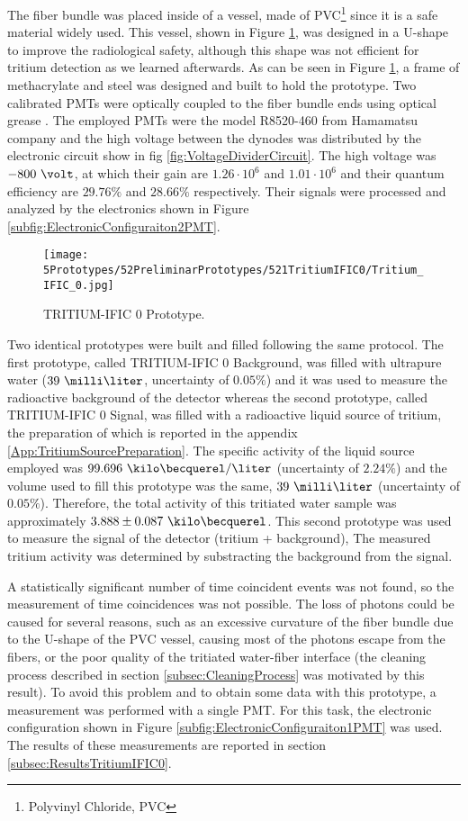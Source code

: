 The fiber bundle was placed inside of a vessel, made of PVC\footnote{Polyvinyl Chloride, PVC}  since it is a safe material widely used. This vessel, shown in Figure \ref{fig:TritiumIFIC0}, was designed in a U-shape to improve the radiological safety, although this shape was not efficient for tritium detection as we learned afterwards. As can be seen in Figure \ref{fig:TritiumIFIC0}, a frame of methacrylate and steel was designed and built to hold the prototype. Two calibrated PMTs were optically coupled to the fiber bundle ends using optical grease \cite{OpticalGrease}. The employed PMTs were the model R8520-460 from Hamamatsu company \cite{DataSheetPMTs} and the high voltage between the dynodes was distributed by the electronic circuit show in fig  \ref{fig:VoltageDividerCircuit}. The high voltage was $-800~\volt$, at which their gain are $1.26 \cdot{} 10^6$ and $1.01 \cdot{} 10^6$ and their quantum efficiency are $29.76\%$ and $28.66\%$ respectively. Their signals were processed and analyzed by the electronics shown in Figure \ref{subfig:ElectronicConfiguraiton2PMT}.

\begin{figure}[h]
\centering
\texttt{[image: 5Prototypes/52PreliminarPrototypes/521TritiumIFIC0/Tritium\_IFIC\_0.jpg]}
\caption{TRITIUM-IFIC 0 Prototype.\label{fig:TritiumIFIC0}}
\end{figure}

Two identical prototypes were built and filled following the same protocol. The first prototype, called TRITIUM-IFIC 0 Background, was filled with  ultrapure water ($39~\milli\liter$, uncertainty of $0.05\%$) and it was used to measure the radioactive background of the detector whereas the second prototype, called TRITIUM-IFIC 0 Signal, was filled with a radioactive liquid source of tritium, the preparation of which is reported in the appendix \ref{App:TritiumSourcePreparation}. The specific activity of the liquid source employed was $99.696~\kilo\becquerel/\liter$ (uncertainty of $2.24\%$) and the volume used to fill this prototype was the same, $39~\milli\liter$ (uncertainty of $0.05\%$). Therefore, the total activity of this tritiated water sample was approximately $3.888 \pm 0.087~\kilo\becquerel$. This second prototype was used to measure the signal of the detector (tritium + background), The measured tritium activity was determined by substracting the background from the signal. 

A statistically significant number of time coincident events was not found, so the measurement of time coincidences was not possible. The loss of photons could be caused for several reasons, such as an excessive curvature of the fiber bundle due to the U-shape of the PVC vessel, causing most of the photons escape from the fibers, or the poor quality of the tritiated water-fiber interface (the cleaning process described in section \ref{subsec:CleaningProcess} was motivated by this result). To avoid this problem and to obtain some data with this prototype, a measurement was performed with a single PMT. For this task, the electronic configuration shown in Figure \ref{subfig:ElectronicConfiguraiton1PMT} was used. The results of these measurements are reported in section \ref{subsec:ResultsTritiumIFIC0}.

